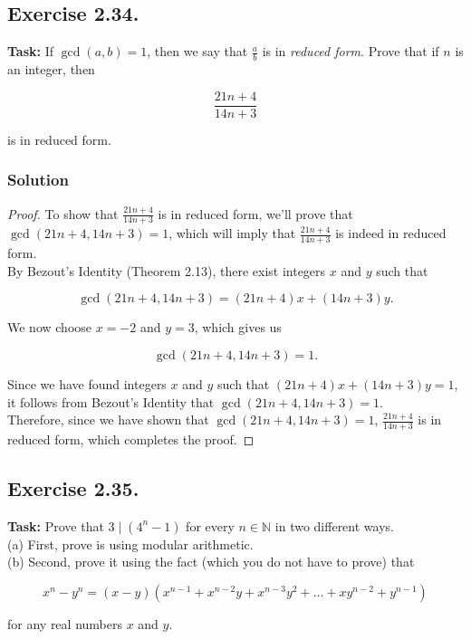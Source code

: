 \documentclass{article}
\begin{document}
\newpage

\subsection{Exercise 2.34.}
\textbf{Task:} If $\gcd(a,b)=1$, then we say that $\frac{a}{b}$ is in \textit{reduced form}. Prove that if $n$ is an integer, then

\[\frac{21n+4}{14n+3}\]

is in reduced form.

\subsubsection*{Solution}

\begin{proof}
    To show that $\frac{21n+4}{14n+3}$ is in reduced form, we'll prove that \\$\gcd(21n+4, 14n+3) = 1$, which will imply that $\frac{21n+4}{14n+3}$ is indeed in reduced form.\\
    By Bezout's Identity (Theorem 2.13), there exist integers $x$ and $y$ such that 

    \[\gcd(21n+4, 14n+3) = (21n+4)x + (14n+3)y.\]

    We now choose $x = -2$ and $y = 3$, which gives us

    \[\gcd(21n+4, 14n+3) = 1.\]
    
    Since we have found integers $x$ and $y$ such that $(21n+4)x + (14n+3)y = 1$, it follows from Bezout's Identity that $\gcd(21n+4, 14n+3) = 1$. \\Therefore, since we have shown that $\gcd(21n+4, 14n+3) = 1$, $\frac{21n+4}{14n+3}$ is in reduced form, which completes the proof.
\end{proof}

\newpage

\subsection{Exercise 2.35.}
\textbf{Task:} Prove that $3 \mid (4^n-1)$ for every $n \in \mathbb{N}$ in two different ways.\\
(a) First, prove is using modular arithmetic.\\
(b) Second, prove it using the fact (which you do not have to prove) that 

\[x^n-y^n=(x-y)(x^{n-1}+x^{n-2}y+x^{n-3}y^2+ \dots + xy^{n-2}+y^{n-1})\]

for any real numbers $x$ and $y$.
\end{document}
